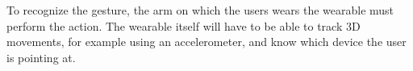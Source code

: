To recognize the gesture, the arm on which the users wears the wearable must perform the action. 
The wearable itself will have to be able to track 3D movements, for example using an accelerometer,
and know which device the user is pointing at. 

